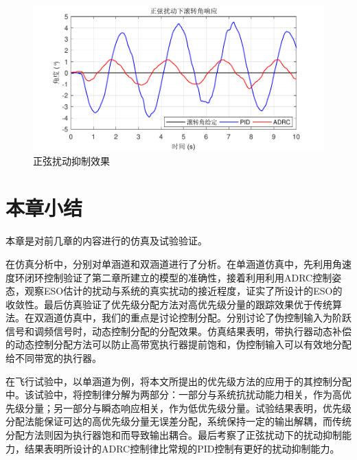 \begin{figure}[htbp]
	\centering	
	\includegraphics[scale=1]{Fig/PID_ADRC.pdf}
	\caption{\label{PID_ADRC}正弦扰动抑制效果}
\end{figure}
\section{本章小结}
本章是对前几章的内容进行的仿真及试验验证。

在仿真分析中，分别对单涵道和双涵道进行了分析。在单涵道仿真中，先利用角速度环闭环控制验证了第二章所建立的模型的准确性，接着利用利用ADRC控制姿态，观察ESO估计的扰动与系统的真实扰动的接近程度，证实了所设计的ESO的收敛性。最后仿真验证了优先级分配方法对高优先级分量的跟踪效果优于传统算法。在双涵道仿真中，我们的重点是讨论控制分配。分别讨论了伪控制输入为阶跃信号和调频信号时，动态控制分配的分配效果。仿真结果表明，带执行器动态补偿的动态控制分配方法可以防止高带宽执行器提前饱和，伪控制输入可以有效地分配给不同带宽的执行器。


在飞行试验中，以单涵道为例，将本文所提出的优先级方法的应用于的其控制分配中。该试验中，将控制律分解为两部分：一部分与系统抗扰动能力相关，作为高优先级分量；另一部分与瞬态响应相关，作为低优先级分量。试验结果表明，优先级分配法能保证可达的高优先级分量无误差分配，系统保持一定的输出解耦，而传统分配方法则因为执行器饱和而导致输出耦合。最后考察了正弦扰动下的扰动抑制能力，结果表明所设计的ADRC控制律比常规的PID控制有更好的扰动抑制能力。




